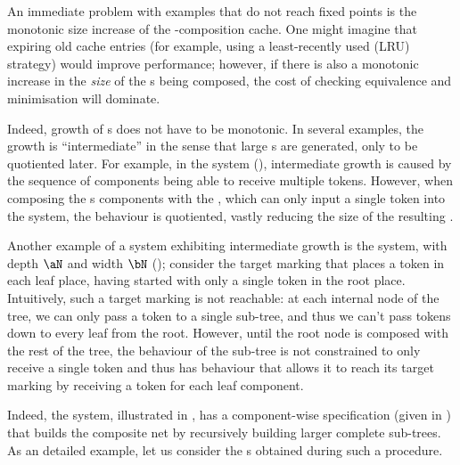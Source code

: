 \label{sec:poorexamples}
An immediate problem with examples that do not reach fixed points is the
monotonic size increase of the \TNFA{}-composition cache. One might imagine
that expiring old cache entries (for example, using a least-recently used (LRU)
strategy) would improve performance; however, if there is also a monotonic
increase in the \emph{size} of the \TNFA{}s being composed, the cost of
checking equivalence and minimisation will dominate.

Indeed, growth of \TNFA{}s does not have to be monotonic. In several examples,
the growth is ``intermediate'' in the sense that large \TNFA{}s are generated,
only to be quotiented later.
For example, in
the \tokenringSys{-} system (), intermediate
growth is caused by the sequence of \workerC{} components being able to receive
multiple tokens. However, when composing the \workerC{}s components with the
\injectorC{}, which can only input a single token into the system, the
behaviour is quotiented, vastly reducing the size of the resulting \TNFA{}.

Another example of a system exhibiting intermediate growth is the
\distree{\aN}{\bN} system, with depth $\aN$ and width $\bN$
(); consider the target marking that places a token
in each leaf place, having started with only a single token in the root place.
Intuitively, such a target marking is not reachable: at each internal
node of the tree, we can only pass a token to a single sub-tree, and thus we
can't pass tokens down to every leaf from the root. However, until the root
node is composed with the rest of the tree, the behaviour of the sub-tree is not
constrained to only receive a single token and thus has behaviour that allows
it to reach its target marking by receiving a token for each leaf component.

Indeed, the  system, illustrated in , has a
component-wise specification (given in ) that builds
the composite net by recursively building larger complete sub-trees. As an
detailed example, let us consider the \TNFA{}s obtained during such a
procedure.

